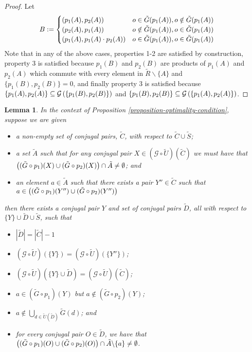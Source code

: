 \documentclass[twocolumn,showpacs,preprintnumbers,amsmath,amssymb,nofootinbib,pra,floatfix]{revtex4-1}
\newtheorem{lemma}{Lemma}
\newcommand{\set}{\tilde}
\newcommand{\genfun}{\mathcal{G}}
\begin{document}
\begin{proof}
Let
$$
B:=
\begin{cases}
\paren{p_1(A),p_2(A)} & o\in \set G(p_1(A)), o\notin \set G(p_1(A)) \\
\paren{p_2(A),p_1(A)} & o\notin \set G(p_1(A)), o\in\set G(p_1(A)) \\
\paren{p_1(A),p_1(A)\cdot p_2(A)} & o\in\set G(p_1(A)), o\in\set G(p_1(A)) \\
\end{cases}
$$
Note that in any of the above cases, properties 1-2 are satisfied by construction, property 3 is satisfied because $p_1(B)$ and $p_2(B)$ are products of $p_1(A)$ and $p_2(A)$ which commute with every element in $\set R\backslash\{A\}$ and $\{p_1(B),p_2(B)\}=0$, and finally property 3 is satisfied because $\{p_1(A),p_2(A)\}\subseteq \genfun\paren{\{p_1(B),p_2(B)\}}$ and $\{p_1(B),p_2(B)\}\subseteq \genfun\paren{\{p_1(A),p_2(A)\}}$.
\end{proof}
\begin{lemma}
\label{directed-gaussian-elimination-of-logicals}
In the context of Proposition \ref{proposition-optimality-condition}, suppose we are given
\begin{itemize}
\item a non-empty set of conjugal pairs, $\set C$, with respect to $\set C \cup \set S$;
\item a set $\set A$ such that for any conjugal pair $X\in(\genfun\circ\set U)(\set C)$ we must have that $\paren{(\set G\circ p_1)(X) \cup (\set G\circ p_2)(X)} \cap \set A \ne \emptyset$; and
\item an element $a\in \set A$ such that there exists a pair $Y''\in\set C$ such that $a\in\paren{(\set G\circ p_1)(Y'') \cup (\set G\circ p_2)(Y'')}$
\end{itemize}
then there exists a conjugal pair $Y$ and set of conjugal pairs $\set D$, all with respect to $\{Y\}\cup \set D \cup \set S$, such that
\begin{itemize}
\item $|\set D| = |\set C|-1$
\item $(\genfun\circ\set U)(\{Y\})=(\genfun\circ\set U)(\{Y''\})$;
\item $(\genfun\circ\set U)(\{Y\}\cup \set D)=(\genfun\circ\set U)(\set C)$;
\item $a\in (\set G\circ p_1)(Y)$ but $a\notin (\set G\circ p_2)(Y)$;
\item $a\notin \bigcup_{d\in \set U(\set D)} \set G(d)$; and
\item for every conjugal pair $O\in\set D$, we have that $\paren{(\set G\circ p_1)(O) \cup (\set G\circ p_2)(O)} \cap \set A\backslash \{a\} \ne \emptyset$.
\end{itemize}
\end{lemma}
\end{document}
